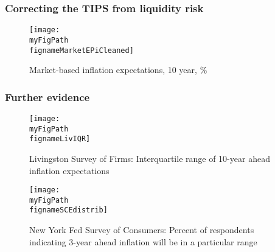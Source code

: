 \documentclass[10pt]{beamer}
\def \myFigPath {../../../figures/}
\def\fignameMarketEPiCleaned{cleaned_epi10_2020_07_28}
\def\fignameSCEdistrib{SCE_distrib_topbottom_command_anchoring_in_data_14_Sep_2020_18_12_59}
\def\fignameLivIQR{Livingston_IQR_command_anchoring_in_data_14_Sep_2020_18_12_59}
\begin{document}
\begin{frame}[plain]  %
\frametitle{Correcting the TIPS from liquidity risk}

\begin{figure}[h!]
\texttt{[image: \\myFigPath \\fignameMarketEPiCleaned]} %
\caption{Market-based inflation expectations, 10 year, \%}
\label{epi_cleaned}
\end{figure}

\vfill 
\hyperlink{LRE_drifting_down}{}	

\end{frame}


\begin{frame}
	\frametitle{Further evidence}\label{further_evidence}


\begin{figure}[h!]
\caption{Livingston Survey of Firms: \newline Interquartile range of 10-year ahead inflation expectations}
\texttt{[image: \\myFigPath \\fignameLivIQR]}
\label{LivIQR}
\end{figure}

\vfill 
\hyperlink{rolling}{}	

\end{frame}

\begin{frame}

\begin{figure}[h!]
\caption{New York Fed Survey of Consumers: \newline Percent of respondents indicating 3-year ahead inflation will be in a particular range}
\texttt{[image: \\myFigPath \\fignameSCEdistrib]}
\label{SCEdistrib}
\end{figure}

\vfill 
\hyperlink{rolling}{}	

\end{frame}
\end{document}
